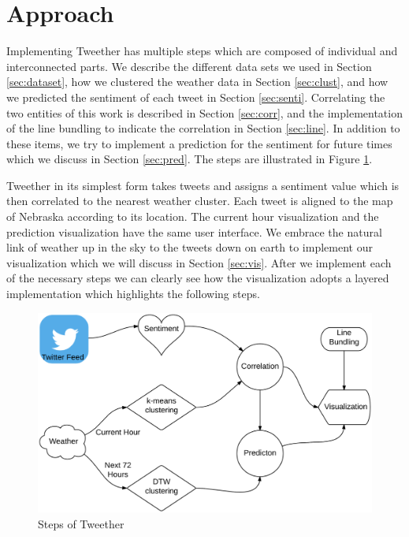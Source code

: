 \documentclass[journal]{vgtc}                %
\begin{document}
\section{Approach}

Implementing Tweether has multiple steps which are composed of individual and interconnected parts. We describe the different data sets we used in Section \ref{sec:dataset}, how we clustered the weather data in Section \ref{sec:clust}, and how we predicted the sentiment of each tweet in Section \ref{sec:senti}. Correlating the two entities of this work is described in Section \ref{sec:corr}, and the implementation of the line bundling to indicate the correlation in Section \ref{sec:line}.  In addition to these items, we try to implement a prediction  for the sentiment for future times which we discuss in Section \ref{sec:pred}. The steps are illustrated in Figure \ref{fig:steps}. 

Tweether in its simplest form takes tweets and assigns a sentiment value which is then correlated to the nearest weather cluster. Each tweet is aligned to the map of Nebraska according to its location. The current hour visualization and the prediction visualization have the same user interface. We embrace the natural link of weather up in the sky to the tweets down on earth to implement our visualization which we will discuss in Section \ref{sec:vis}. After we implement each of the necessary steps we can clearly see how the visualization adopts a layered implementation which highlights the following steps.

\begin{figure}[htb]
 \centering
 \includegraphics[scale=0.1]{steps}
 \caption{Steps of Tweether}
 \label{fig:steps}
\end{figure}
\end{document}
